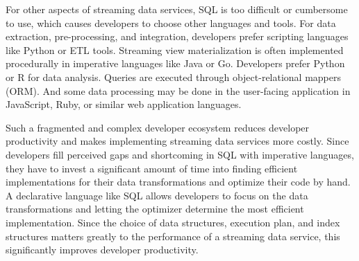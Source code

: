 \documentclass[	DIV=calc,%
							paper=letter,%
							fontsize=11pt,%
							twocolumn]{scrartcl}	 					%
\begin{document}

For other aspects of streaming data services, SQL is too difficult or cumbersome to use, which causes developers to choose other languages and tools. For data extraction, pre-processing, and integration, developers prefer scripting languages like Python or ETL tools. Streaming view materialization is often implemented procedurally in imperative languages like Java or Go. Developers prefer Python or R for data analysis. Queries are executed through object-relational mappers (ORM). And some data processing may be done in the user-facing application in JavaScript, Ruby, or similar web application languages.

Such a fragmented and complex developer ecosystem reduces developer productivity and makes implementing streaming data services more costly. Since developers fill perceived gaps and shortcoming in SQL with imperative languages, they have to invest a significant amount of time into finding efficient implementations for their data transformations and optimize their code by hand. A declarative language like SQL allows developers to focus on the data transformations and letting the optimizer determine the most efficient implementation. Since the choice of data structures, execution plan, and index structures matters greatly to the performance of a streaming data service, this significantly improves developer productivity.


\printbibliography
\end{document}
